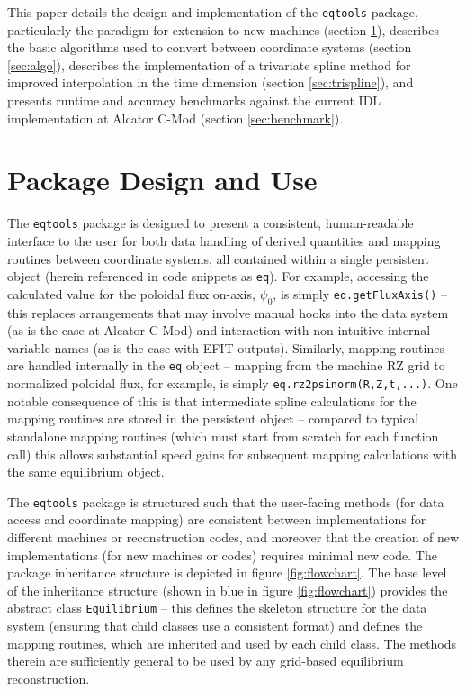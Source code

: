 \documentclass[12pt,floatfix,showpacs]{revtex4-1}
\newcommand{\gnote}[1]{\marginpar{\scriptsize\textcolor{red}{#1}}}
\newcommand{\eqtools}{\texttt{eqtools}\xspace}
\begin{document}
This paper details the design and implementation of the \eqtools package, particularly the paradigm for extension to new machines (section \ref{sec:design}), describes the basic algorithms used to convert between coordinate systems (section \ref{sec:algo}), describes the implementation of a trivariate spline method for improved interpolation in the time dimension (section \ref{sec:trispline}), and presents runtime and accuracy benchmarks against the current IDL implementation at Alcator C-Mod (section \ref{sec:benchmark}).

\section{Package Design and Use}\label{sec:design}

The \eqtools package is designed to present a consistent, human-readable interface to the user for both data handling of derived quantities and mapping routines between coordinate systems, all contained within a single persistent object (herein referenced in code snippets as \verb|eq|).  For example, accessing the calculated value for the poloidal flux on-axis, $\psi_0$, is simply \verb|eq.getFluxAxis()| -- this replaces arrangements that may involve manual hooks into the data system (as is the case at Alcator C-Mod) and interaction with non-intuitive internal variable names (as is the case with EFIT outputs\gnote{too harsh?}\gnote{Perhaps we could emphasize this with code snippets of the old way?}).  Similarly, mapping routines are handled internally in the \verb|eq| object -- mapping from the machine RZ grid to normalized poloidal flux, for example, is simply \verb|eq.rz2psinorm(R,Z,t,...)|.  One notable consequence of this is that intermediate spline calculations for the mapping routines are stored in the persistent object -- compared to typical standalone mapping routines (which must start from scratch for each function call) this allows substantial speed gains for subsequent mapping calculations with the same equilibrium object.

The \eqtools package is structured such that the user-facing methods (for data access and coordinate mapping) are consistent between implementations for different machines or reconstruction codes, and moreover that the creation of new implementations (for new machines or codes) requires minimal new code.  The package inheritance structure is depicted in figure \ref{fig:flowchart}.  The base level of the inheritance structure (shown in blue in figure \ref{fig:flowchart}) provides the abstract class \verb|Equilibrium| -- this defines the skeleton structure for the data system (ensuring that child classes use a consistent format) and defines the mapping routines, which are inherited and used by each child class.  The methods therein are sufficiently general to be used by any grid-based equilibrium reconstruction.
\end{document}
